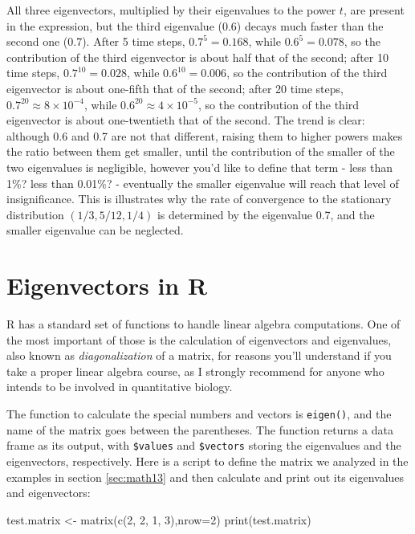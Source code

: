 \documentclass[
  letterpaper,
  DIV=11,
  numbers=noendperiod]{scrreprt}
\newenvironment{Shaded}{\begin{snugshade}}{\end{snugshade}}
\newcommand{\AttributeTok}[1]{\textcolor[rgb]{0.40,0.45,0.13}{#1}}
\newcommand{\DecValTok}[1]{\textcolor[rgb]{0.68,0.00,0.00}{#1}}
\newcommand{\FunctionTok}[1]{\textcolor[rgb]{0.28,0.35,0.67}{#1}}
\newcommand{\NormalTok}[1]{\textcolor[rgb]{0.00,0.23,0.31}{#1}}
\newcommand{\OtherTok}[1]{\textcolor[rgb]{0.00,0.23,0.31}{#1}}
\begin{document}
All three eigenvectors, multiplied by their eigenvalues to the power
\(t\), are present in the expression, but the third eigenvalue (0.6)
decays much faster than the second one (0.7). After 5 time steps,
\(0.7^5 = 0.168\), while \(0.6^5 = 0.078\), so the contribution of the
third eigenvector is about half that of the second; after 10 time steps,
\(0.7^{10} = 0.028\), while \(0.6^{10} = 0.006\), so the contribution of
the third eigenvector is about one-fifth that of the second; after 20
time steps, \(0.7^{20} \approx 8 \times 10^{-4}\), while
\(0.6^{20} \approx 4 \times 10^{-5}\), so the contribution of the third
eigenvector is about one-twentieth that of the second. The trend is
clear: although 0.6 and 0.7 are not that different, raising them to
higher powers makes the ratio between them get smaller, until the
contribution of the smaller of the two eigenvalues is negligible,
however you'd like to define that term - less than 1\%? less than
0.01\%? - eventually the smaller eigenvalue will reach that level of
insignificance. This is illustrates why the rate of convergence to the
stationary distribution \((1/3, 5/12, 1/4)\) is determined by the
eigenvalue 0.7, and the smaller eigenvalue can be neglected.

\hypertarget{eigenvectors-in-r}{%
\section{Eigenvectors in R}\label{eigenvectors-in-r}}

R has a standard set of functions to handle linear algebra computations.
One of the most important of those is the calculation of eigenvectors
and eigenvalues, also known as \emph{diagonalization} of a matrix, for
reasons you'll understand if you take a proper linear algebra course, as
I strongly recommend for anyone who intends to be involved in
quantitative biology.

The function to calculate the special numbers and vectors is
\texttt{eigen()}, and the name of the matrix goes between the
parentheses. The function returns a data frame as its output, with
\texttt{\$values} and \texttt{\$vectors} storing the eigenvalues and the
eigenvectors, respectively. Here is a script to define the matrix we
analyzed in the examples in section \ref{sec:math13} and then calculate
and print out its eigenvalues and eigenvectors:

\begin{Shaded}
\begin{Highlighting}[]
\NormalTok{test.matrix }\OtherTok{\textless{}{-}} \FunctionTok{matrix}\NormalTok{(}\FunctionTok{c}\NormalTok{(}\DecValTok{2}\NormalTok{,  }\DecValTok{2}\NormalTok{, }\DecValTok{1}\NormalTok{, }\DecValTok{3}\NormalTok{),}\AttributeTok{nrow=}\DecValTok{2}\NormalTok{)}
\FunctionTok{print}\NormalTok{(test.matrix)}
\end{Highlighting}
\end{Shaded}
\end{document}

